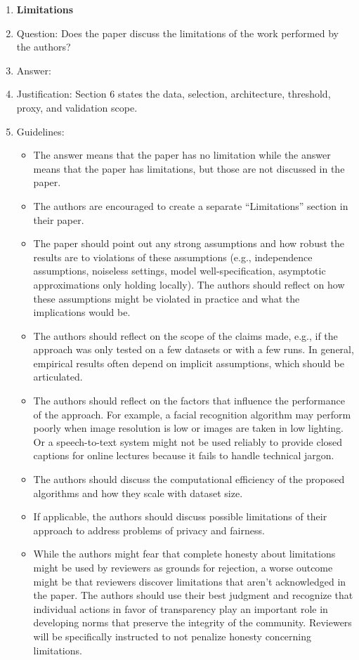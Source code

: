 \documentclass{article}
\begin{document}
\begin{enumerate}
\item {\bf Limitations}
    \item[] Question: Does the paper discuss the limitations of the work performed by the authors?
    \item[] Answer: \answerYes{}
    \item[] Justification: Section 6 states the data, selection, architecture, threshold, proxy, and validation scope.
    \item[] Guidelines:
    \begin{itemize}
        \item The answer \answerNA{} means that the paper has no limitation while the answer \answerNo{} means that the paper has limitations, but those are not discussed in the paper. 
        \item The authors are encouraged to create a separate ``Limitations'' section in their paper.
        \item The paper should point out any strong assumptions and how robust the results are to violations of these assumptions (e.g., independence assumptions, noiseless settings, model well-specification, asymptotic approximations only holding locally). The authors should reflect on how these assumptions might be violated in practice and what the implications would be.
        \item The authors should reflect on the scope of the claims made, e.g., if the approach was only tested on a few datasets or with a few runs. In general, empirical results often depend on implicit assumptions, which should be articulated.
        \item The authors should reflect on the factors that influence the performance of the approach. For example, a facial recognition algorithm may perform poorly when image resolution is low or images are taken in low lighting. Or a speech-to-text system might not be used reliably to provide closed captions for online lectures because it fails to handle technical jargon.
        \item The authors should discuss the computational efficiency of the proposed algorithms and how they scale with dataset size.
        \item If applicable, the authors should discuss possible limitations of their approach to address problems of privacy and fairness.
        \item While the authors might fear that complete honesty about limitations might be used by reviewers as grounds for rejection, a worse outcome might be that reviewers discover limitations that aren't acknowledged in the paper. The authors should use their best judgment and recognize that individual actions in favor of transparency play an important role in developing norms that preserve the integrity of the community. Reviewers will be specifically instructed to not penalize honesty concerning limitations.
    \end{itemize}


\end{enumerate}
\end{document}
